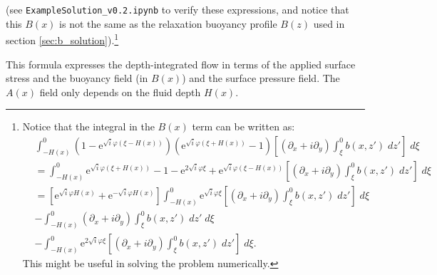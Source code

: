 \documentclass[10pt]{amsart}
\begin{document}
(see \texttt{ExampleSolution\_v0.2.ipynb} to verify these expressions, and notice that this $B(x)$ is not the same as the relaxation buoyancy profile $B(z)$ used in section \ref{sec:b_solution}).\footnote{Notice that the integral in the $B(x)$ term can be written as:
\begin{align}
&  
\int_{-H(x)}^{0} 
\left(
1 - 
\mathrm{e}^{\sqrt{i} \varphi \left( \xi - H(x) \right)} 
\right) \left(
\mathrm{e}^{\sqrt{i} \varphi  \left( \xi + H(x) \right)} - 1
\right)
 \left[ \left( \partial_x + i \partial_y \right) \int_{\xi}^{0} b(x,z') \; dz'  \right] \; d \xi  \nonumber  \\
 & = 
 \int_{-H(x)}^{0} 
\mathrm{e}^{\sqrt{i} \varphi  \left( \xi + H(x) \right)} - 1 - \mathrm{e}^{ 2 \sqrt{i} \varphi  \xi } + \mathrm{e}^{\sqrt{i} \varphi \left( \xi - H(x) \right)} 
 \left[ \left( \partial_x + i \partial_y \right) \int_{\xi}^{0} b(x,z') \; dz'  \right] \; d \xi   \nonumber \\
  & = 
\left[
\mathrm{e}^{\sqrt{i} \varphi  H(x)}  + \mathrm{e}^{- \sqrt{i} \varphi  H(x)} \right]
\int_{-H(x)}^{0} \mathrm{e}^{\sqrt{i} \varphi  \xi } \left[ \left( \partial_x + i \partial_y \right) \int_{\xi}^{0} b(x,z') \; dz'  \right] \; d \xi    \nonumber \\
& -   \int_{-H(x)}^{0} \left( \partial_x + i \partial_y \right) \int_{\xi}^{0} b(x,z') \; dz'   \; d \xi    \nonumber \\
 & - \int_{-H(x)}^{0} \mathrm{e}^{ 2 \sqrt{i} \varphi  \xi }  \left[ \left( \partial_x + i \partial_y \right) \int_{\xi}^{0} b(x,z') \; dz'  \right] \; d \xi \nonumber .
\end{align}
This might be useful in solving the problem numerically.
}

This formula expresses the depth-integrated flow in terms of the applied surface stress and the buoyancy field (in $B(x)$) and the surface pressure field.
The $A(x)$ field only depends on the fluid depth $H(x)$.
\end{document}

